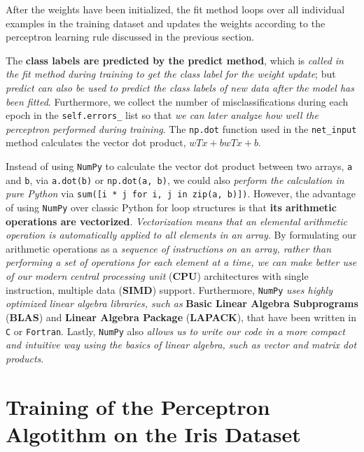 \documentclass[../machine_learning_scikit.tex]{subfiles}
\begin{document}
    After the weights have been initialized, the fit method loops over all individual examples in the training dataset and updates the weights according to the perceptron learning rule discussed in the previous section.

    \begin{obs}
        The \textbf{class labels are predicted by the predict method}, which is \textit{called in the fit method during training to get the class label for the weight update}; but \textit{predict can also be used to predict the class labels of new data after the model has been fitted}. Furthermore, we collect the number of misclassifications during each epoch in the \lstinline|self.errors_| list so that \textit{we can later analyze how well the perceptron performed during training}. The \lstinline|np.dot| function used in the \lstinline|net_input| method calculates the vector dot product, $wTx+bwTx+b$.
    \end{obs}

    \begin{idea}
        Instead of using \lstinline|NumPy| to calculate the vector dot product between two arrays, \lstinline|a| and \lstinline|b|, via \lstinline|a.dot(b)| or \lstinline|np.dot(a, b)|, we could also \textit{perform the calculation in pure Python} via \lstinline|sum([i * j for i, j in zip(a, b)])|. However, the advantage of using \lstinline|NumPy| over classic Python for loop structures is that \textbf{its arithmetic operations are vectorized}. \textit{Vectorization means that an elemental arithmetic operation is automatically applied to all elements in an array}. By formulating our arithmetic operations as a \textit{sequence of instructions on an array, rather than performing a set of operations for each element at a time, we can make better use of our modern central processing unit} (\textbf{CPU}) architectures with single instruction, multiple data (\textbf{SIMD}) support. Furthermore, \lstinline|NumPy| \textit{uses highly optimized linear algebra libraries, such as} \textbf{Basic Linear Algebra Subprograms} (\textbf{BLAS}) and \textbf{Linear Algebra Package} (\textbf{LAPACK}), that have been written in \lstinline|C| or \lstinline|Fortran|. Lastly, \lstinline|NumPy| also \textit{allows us to write our code in a more compact and intuitive way using the basics of linear algebra, such as vector and matrix dot products}.
    \end{idea}

    \section{Training of the Perceptron Algotithm on the Iris Dataset}
\end{document}
